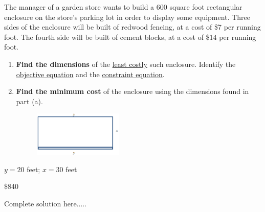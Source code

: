 \begin{multicols}{2}
\begin{minipage}{0.6\textwidth}
\begin{figure}[H]
	    \end{figure}
    \end{minipage}
    
\end{multicols}


\newpage

\begin{example}
The manager of a garden store wants to build a 600 square foot rectangular enclosure on the store’s parking lot in order to display some equipment. Three sides of the enclosure will be built of redwood fencing, at a cost of \$7 per running foot. The fourth side will be built of cement blocks, at a cost of \$14 per running foot. 
\renewcommand{\labelenumi}{(\alph{enumi})}
\begin{enumerate}[leftmargin=*]

\item \textbf{Find the dimensions} of the \underline{least costly} such enclosure. Identify the \underline{objective equation} and the \underline{constraint equation}.
\item \textbf{Find the minimum cost} of the enclosure using the dimensions found in part (a).
\begin{figure}[h]
    \flushleft
    \includegraphics[width=0.4\textwidth]{images/optimization/exampleGardenStore.png}
\end{figure}

\end{enumerate}
    
     \begin{sol}
    \begin{enumInline1}
     
     \item  $y=20$ feet; $x=30$ feet 
     \item  \$840 
  
    \end{enumInline1}
    \end{sol}
     
    \begin{solL}
    Complete solution here.....
    
    \end{solL}
    
\end{example}
\newpage





